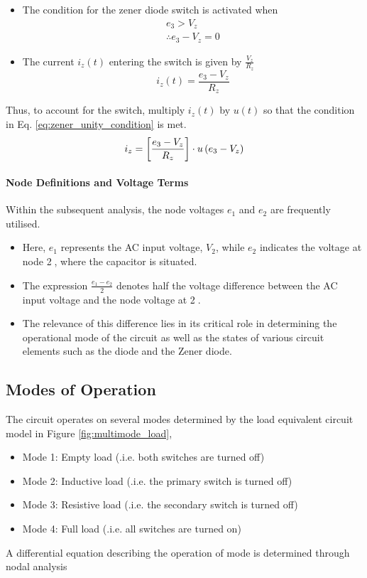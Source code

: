 \begin{itemize}
	\item The condition for the zener diode switch is activated when \begin{equation}
		\begin{split}
			e_3 > V_z \\
			\therefore e_3 - V_z = 0
			\label{eq:zener_unity_condition}
		\end{split}
	\end{equation}
	\item The current $i_z(t)$ entering the switch is given by $\frac{V_z}{R_z}$
	\begin{equation}
		i_z(t) = \frac{e_3 - V_z}{R_z}
	\end{equation}
\end{itemize}
Thus, to account for the switch, multiply $i_z(t)$ by $u(t)$ so that the condition in Eq. \ref{eq:zener_unity_condition} is met.
\begin{equation}
    i_z = \left[\frac{e_3 - V_z}{R_z} \right]\cdot u\left(e_3 - V_z \right)
    \label{eq:zener_current}
\end{equation}

\paragraph{Node Definitions and Voltage Terms}
Within the subsequent analysis, the node voltages $e_1$ and $e_2$ are frequently utilised.
\begin{itemize}
	\item Here, $e_1$ represents the AC input voltage, $V_2$, while $e_2$ indicates the voltage at node \textcircled{2}, where the capacitor is situated.
	\item The expression $\frac{e_1 - e_2}{2}$ denotes half the voltage difference between the AC input voltage and the node voltage at \textcircled{2}.
	\item The relevance of this difference lies in its critical role in determining the operational mode of the circuit as well as the states of various circuit elements such as the diode and the Zener diode.
\end{itemize}

\pagebreak
\subsection{Modes of Operation}
The circuit operates on several modes determined by the load equivalent circuit model in Figure \ref{fig:multimode_load},
\begin{itemize}
	\item Mode 1: Empty load (.i.e. both switches are turned off)
	\item Mode 2: Inductive load (.i.e. the primary switch is turned off)
	\item Mode 3: Resistive load (.i.e. the secondary switch is turned off) 
	\item Mode 4: Full load (.i.e. all switches are turned on)
\end{itemize}
A differential equation describing the operation of mode is determined through nodal analysis

